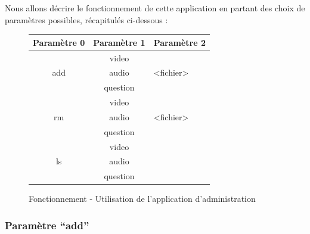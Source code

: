 Nous allons décrire le fonctionnement de cette application en partant des choix de paramètres possibles, récapitulés ci-dessous :

\begin{figure}[!ht]
\begin{center}
\begin{tabularx}{7cm}{|c|c|X|}
 \hline
 Paramètre 0 & Paramètre 1 & Paramètre 2\\
 \hline
	& video		& \tabularnewline
 add	& audio		& <fichier>\tabularnewline
	& question	& \tabularnewline
\hline
	& video		& \tabularnewline
 rm	& audio		& <fichier>\tabularnewline
	& question	& \tabularnewline
\hline
	& video		& \tabularnewline
 ls	& audio		& \tabularnewline
	& question	& \tabularnewline
 \hline
\end{tabularx}
\end{center}
\caption{Fonctionnement - Utilisation de l'application d'administration}
\end{figure}


\subsubsection{Paramètre ``add''}

